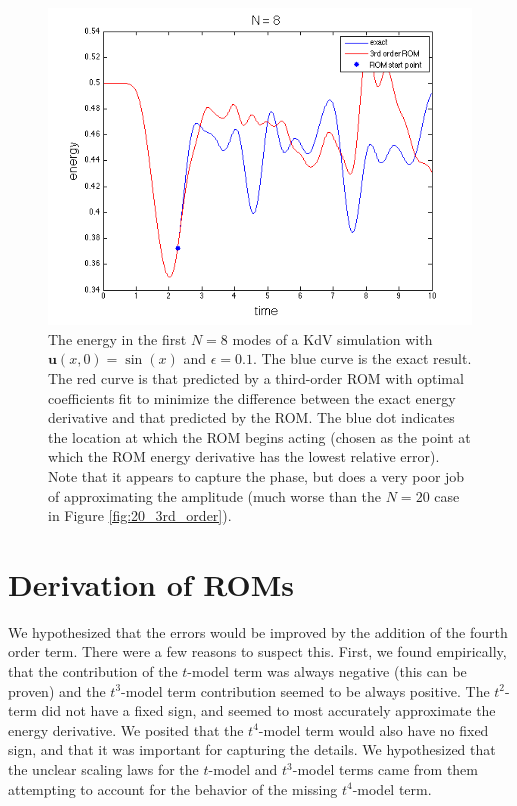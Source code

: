 \documentclass{article}
\begin{document}
\begin{figure}[h]
\includegraphics[width=\textwidth]{3rd_order_8.png}
\caption{The energy in the first $N=8$ modes of a KdV simulation with $\mathbf{u}(x,0) = \sin(x)$ and $\epsilon=0.1$. The blue curve is the exact result. The red curve is that predicted by a third-order ROM with optimal coefficients fit to minimize the difference between the exact energy derivative and that predicted by the ROM. The blue dot indicates the location at which the ROM begins acting (chosen as the point at which the ROM energy derivative has the lowest relative error). Note that it appears to capture the phase, but does a very poor job of approximating the amplitude (much worse than the $N=20$ case in Figure \ref{fig:20_3rd_order}).}\label{fig:8_3rd_order}
\end{figure}

\section{Derivation of ROMs}

We hypothesized that the errors would be improved by the addition of the fourth order term. There were a few reasons to suspect this. First, we found empirically, that the contribution of the $t$-model term was always negative (this can be proven) and the $t^3$-model term contribution seemed to be always positive. The $t^2$-term did not have a fixed sign, and seemed to most accurately approximate the energy derivative. We posited that the $t^4$-model term would also have no fixed sign, and that it was important for capturing the details. We hypothesized that the unclear scaling laws for the $t$-model and $t^3$-model terms came from them attempting to account for the behavior of the missing $t^4$-model term.
\end{document}
